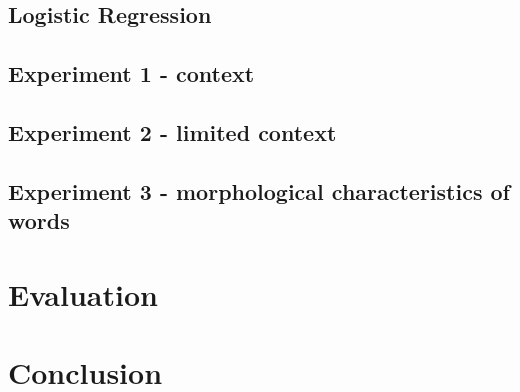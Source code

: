 \documentclass[letterpaper]{article}
\begin{document}
\subsection{Logistic Regression}

\subsection{Experiment 1 - context}

\subsection{Experiment 2 - limited context}

\subsection{Experiment 3 - morphological characteristics of words}

\section{Evaluation}

\section{Conclusion}
\end{document}
